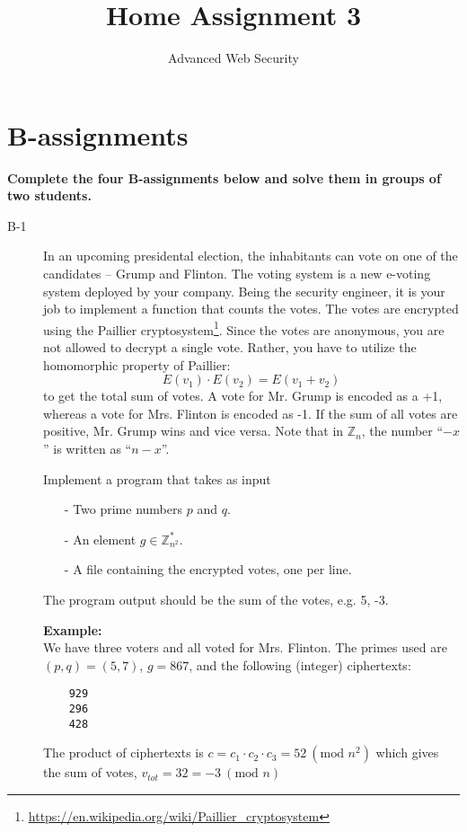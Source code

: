 \documentclass{article}
\begin{document}
\title{Home Assignment 3}
\author{Advanced Web Security}
\date{\the\year}

\maketitle

\section*{B-assignments}
\textbf{Complete the four B-assignments below and solve them in groups of two students.}

\begin{description}

	\item[B-1]{In an upcoming presidental election, the inhabitants can vote on one of the candidates --
	Grump and Flinton. The voting system is a new e-voting system deployed by your company. Being the
	security engineer, it is your job to implement a function that counts the votes. The votes are encrypted
	using the Paillier cryptosystem\footnote{\url{https://en.wikipedia.org/wiki/Paillier_cryptosystem}}. Since the votes are anonymous, you are not allowed to decrypt a single vote.
	Rather, you have to utilize the homomorphic property of Paillier:
	\[
	E(v_1) \cdot E(v_2) = E(v_1 + v_2)
	\]	
	to get the total sum of votes. A vote for Mr. Grump is encoded as a +1, whereas a vote for Mrs. Flinton
	is encoded as -1. If the sum of all votes are positive, Mr. Grump wins and vice versa. Note that in
	$\mathbb{Z}_n$, the number ``$-x$'' is written as ``$n-x$''.
    
    Implement a program that takes as input
	\begin{itemize}
		\item[-] Two prime numbers $p$ and $q$.
		\item[-] An element $g \in \mathbb{Z}_{n^2}^{*}$.
		\item[-] A file containing the encrypted votes, one per line.
	\end{itemize}

	The program output should be the sum of the votes, e.g. 5, -3.
	
	\textbf{Example:}\\
	We have three voters and all voted for Mrs. Flinton. The primes used are
	$(p, q) = (5, 7)$, $g = 867$, and the following (integer) ciphertexts:
	\begin{verbatim}
	929
	296
	428
	\end{verbatim}
	The product of ciphertexts is $c = c_1 \cdot c_2 \cdot c_3 = 52 ~(\textrm{mod } n^2)$
	which gives the sum of votes, $v_{tot} = 32 = -3 ~(\textrm{mod } n)$
	
}
\end{description}
\end{document}
